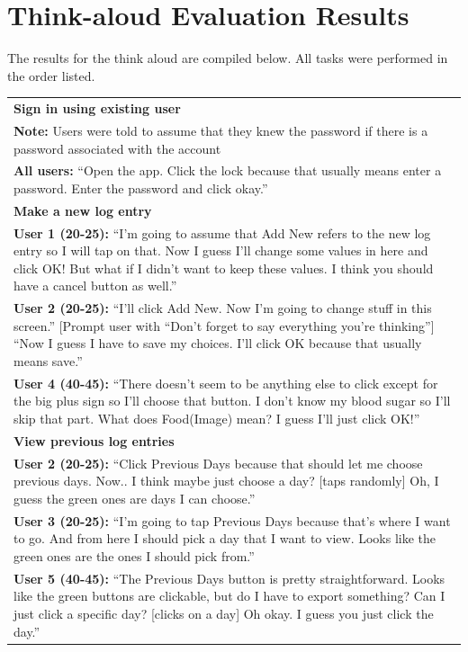 \documentclass[pdftex,12pt,a4paper]{report}
\begin{document}
\section*{Think-aloud Evaluation Results}
The results for the think aloud are compiled below. All tasks were performed in the order listed.
\begin{center}
	\begin{longtable}{|p{\textwidth}|}
	\hline
	\textbf{Sign in using existing user}\\
	\textbf{Note:} Users were told to assume that they knew the password if there is a password associated with the account\\
	\textbf{All users:} ``Open the app. Click the lock because that usually means enter a password. Enter the password and click okay.''\\
	\hline
	\textbf{Make a new log entry}\\
	\textbf{User 1 (20-25):} ``I'm going to assume that Add New refers to the new log entry so I will tap on that. Now I guess I'll change some values in here and click OK! But what if I didn't want to keep these values. I think you should have a cancel button as well.''\\
	\textbf{User 2 (20-25):} ``I'll click Add New. Now I'm going to change stuff in this screen.'' [Prompt user with ``Don't forget to say everything you're thinking''] ``Now I guess I have to save my choices. I'll click OK because that usually means save.''\\
	\textbf{User 4 (40-45):} ``There doesn't seem to be anything else to click except for the big plus sign so I'll choose that button. I don't know my blood sugar so I'll skip that part. What does Food(Image) mean? I guess I'll just click OK!''\\
	\hline
	\textbf{View previous log entries}\\
	\textbf{User 2 (20-25):} ``Click Previous Days because that should let me choose previous days. Now.. I think maybe just choose a day? [taps randomly]  Oh, I guess the green ones are days I can choose.''\\
	\textbf{User 3 (20-25):} ``I'm going to tap Previous Days because that's where I want to go. And from here I should pick a day that I want to view. Looks like the green ones are the ones I should pick from.''\\
	\textbf{User 5 (40-45):} ``The Previous Days button is pretty straightforward. Looks like the green buttons are clickable, but do I have to export something? Can I just click a specific day? [clicks on a day] Oh okay. I guess you just click the day.''\\

\end{longtable}
\end{center}
\end{document}
